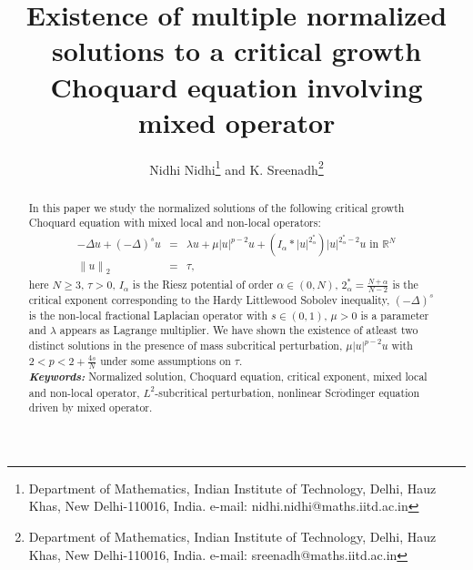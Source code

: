 \documentclass[11pt]{article}
\title{Existence of multiple normalized solutions to a critical growth Choquard equation involving mixed operator}
\author{Nidhi Nidhi\footnote{Department of Mathematics, Indian Institute of Technology, Delhi, Hauz Khas, New Delhi-110016, India. e-mail: nidhi.nidhi@maths.iitd.ac.in}\; and K. Sreenadh\footnote{Department of Mathematics, Indian Institute of Technology, Delhi, Hauz Khas, New Delhi-110016, India. e-mail: sreenadh@maths.iitd.ac.in}\;}
\date{}
\providecommand{\keywords}[1]
{
	\small	
	\textbf{\textit{Keywords:}} #1
}
\numberwithin{equation}{section}
\numberwithin{mytheorem}{section}
\begin{document}
	\maketitle
	\begin{abstract}
		\noindent In this paper we study the normalized solutions of the following critical growth Choquard equation with mixed local and non-local operators: 
		\begin{equation*}
			\begin{array}{rcl}
				-\Delta u +(-\Delta)^s u & = & \lambda u +\mu |u|^{p-2}u +(I_{\alpha}*|u|^{2^*_{\alpha}})|u|^{2^*_{\alpha}-2}u \text{ in } \mathbb{R}^N\\
				\left\| u \right\|_2 & =  & \tau,
			\end{array}
		\end{equation*}
		here $N\geq 3$, $\tau>0$, $I_{\alpha}$ is the Riesz potential of order $\alpha\in (0,N)$, $2^*_{\alpha}=\frac{N+\alpha}{N-2}$ is the critical exponent corresponding to the Hardy Littlewood Sobolev inequality, $(-\Delta)^s$ is the non-local fractional Laplacian operator with $s\in (0,1)$, $\mu>0$ is a parameter and $\lambda$ appears as Lagrange multiplier. We have shown the existence of atleast two distinct solutions in the presence of mass subcritical perturbation, $\mu |u|^{p-2}u$ with $2<p<2+\frac{4s}{N}$ under some assumptions on $\tau$.\\
		\noindent \keywords{ Normalized solution, Choquard equation, critical exponent, mixed local and non-local operator, $L^2$-subcritical perturbation, nonlinear Scr$\ddot{\text{o}}$dinger equation driven by mixed operator.}
	\end{abstract}
\end{document}
